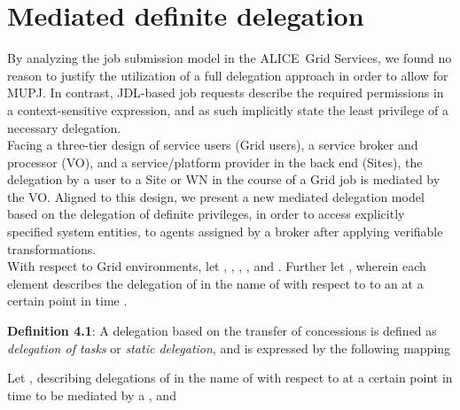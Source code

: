 \documentclass[10pt]{iopart}
\newcommand{\alice}{ALICE}
\begin{document}
\section{Mediated definite delegation}
\label{model}
By analyzing the job submission model in the \alice\ Grid Services, we found no
reason to justify the utilization of a full delegation approach in
order to allow for MUPJ. In contrast, JDL-based job requests
describe the required permissions in a context-sensitive
expression, and as such implicitly state the least privilege of a necessary
delegation.\\
Facing a three-tier design of service users (Grid users), a service
broker and processor (VO), and a service/platform provider in the back end (Sites), 
the delegation by a user to a Site or WN in the course of a Grid job is mediated
by the VO. Aligned to this design, we present a new mediated delegation
model based on the delegation of definite privileges, in order to access explicitly
specified system entities, to agents assigned by a broker after applying
verifiable transformations.\\
With respect to Grid environments, let
,
,
, , and .
Further let , wherein each element describes
the delegation of  in the name of  with respect to  to an  
at a certain point in time .\\
\par
\begingroup
\leftskip=0.4cm \noindent
\textbf{Definition 4.1}: A
delegation based on the transfer of concessions is defined as \textit{delegation of tasks}
or \textit{static delegation}, and is expressed by the following mapping
\par
\endgroup\noindent
\begin{center}

\end{center}
Let ,  describing delegations of  in
the name of  with respect to  at a certain point in time 
to be mediated by a , and 
 
\end{document}
